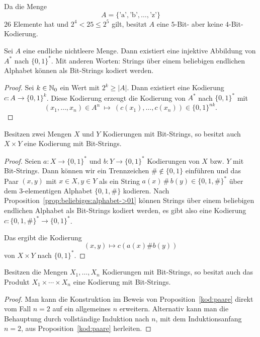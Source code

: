 \begin{bsp}
	Da die Menge 
	\[
		A = \{\text{'a'},\text{'b'},\ldots,\text{'z'}\}
	\]
	$26$ Elemente hat und $2^4 < 25 \le 2^5$ gilt, besitzt $A$ eine $5$-Bit- aber keine $4$-Bit-Kodierung. 
\end{bsp} 

\begin{prop} \label{prop:beliebiges:alphabet->01}
	Sei $A$ eine endliche nichtleere Menge. Dann existiert eine injektive Abbildung von $A^\ast$ nach $\{0,1\}^\ast$. Mit anderen Worten: Strings über einem beliebigen endlichen Alphabet können als Bit-Strings kodiert werden. 
\end{prop} 
\begin{proof} 
	Sei $k \in \mathbb{N}_0$ ein Wert mit $2^k \ge |A|$. Dann existiert eine Kodierung $ c : A \to \{0,1\}^k$. Diese Kodierung erzeugt die Kodierung  von $A^\ast$ nach $\{0,1\}^\ast$ mit
	\[
		(x_1, \ldots ,x_n) \in A^n \ \mapsto \ (c(x_1),\ldots,c(x_n)) \in \{0,1\}^{nk}.
	\]
\end{proof} 


\begin{prop} \label{kod:paare}
	Besitzen zwei Mengen $X$ und $Y$ Kodierungen mit Bit-Strings, so besitzt auch $X \times Y$ eine Kodierung mit Bit-Strings. 
\end{prop} 
\begin{proof}
	Seien $ a : X \to \{0,1\}^\ast$ und $b : Y \to \{0,1\}^\ast$ Kodierungen von $X$ bzw. $Y$ mit Bit-Strings. Dann können wir ein Trennzeichen $\# \not\in \{0,1\}$ einführen und das Paar $(x,y)$ mit $x \in X, y \in Y$ als ein String $a(x) \, \# \,  b(y) \in \{0,1,\#\}^\ast$ über dem $3$-elementigen Alphabet $\{0,1,\#\}$ kodieren. Nach Proposition~\ref{prop:beliebiges:alphabet->01} können Strings über einem beliebigen endlichen Alphabet als Bit-Strings kodiert werden, es gibt also eine Kodierung $c : \{0,1,\#\}^\ast \to \{0,1\}^\ast$.

	 Das ergibt die Kodierung 
	 \[
	 		(x,y) \mapsto c ( a(x) \# b(y))
	 \] 
	 von $X \times Y$ nach $\{0,1\}^\ast$. 
\end{proof} 

\begin{kor} \label{kod:tupel}
	Besitzen die Mengen $X_1,\ldots,X_n$ Kodierungen mit Bit-Strings, so besitzt auch das Produkt $X_1 \times \cdots \times X_n$ eine Kodierung mit Bit-Strings. 
\end{kor} 
\begin{proof} 
Man kann die Konstruktion im Beweis von Proposition~\ref{kod:paare} direkt vom Fall $n=2$ auf ein allgemeines $n$ erweitern. Alternativ kann man die Behauptung durch vollständige Induktion nach $n$, mit dem Induktionsanfang $n=2$, aus Proposition~\ref{kod:paare} herleiten. 
\end{proof} 

